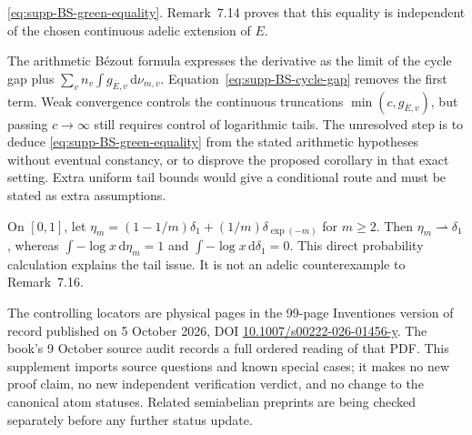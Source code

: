 \documentclass[11pt,a4paper]{article}
\theoremstyle{definition}
\theoremstyle{remark}
\newcommand{\rd}{\mathrm d}
\begin{document}
\begin{description}
\eqref{eq:supp-BS-green-equality}. Remark~7.14 proves that this equality
is independent of the chosen continuous adelic extension of $E$.
\item[The missing passage.]
The arithmetic B\'ezout formula expresses the derivative as the limit
of the cycle gap plus
$\sum_v n_v\int g_{\overline E,v}\,\rd\nu_{m,v}$.
Equation~\eqref{eq:supp-BS-cycle-gap} removes the first term.
Weak convergence controls the continuous truncations
$\min(c,g_{\overline E,v})$, but passing $c\to\infty$ still requires
control of logarithmic tails. The unresolved step is to deduce
\eqref{eq:supp-BS-green-equality} from the stated arithmetic hypotheses
without eventual constancy, or to disprove the proposed corollary in
that exact setting. Extra uniform tail bounds would give a conditional
route and must be stated as extra assumptions.
\item[Elementary obstruction to a weak-convergence-only argument.]
On $[0,1]$, let
$\eta_m=(1-1/m)\delta_1+(1/m)\delta_{\exp(-m)}$ for $m\geq2$.
Then $\eta_m\rightharpoonup\delta_1$, whereas
$\int-\log x\,\rd\eta_m=1$ and
$\int-\log x\,\rd\delta_1=0$.
This direct probability calculation explains the tail issue. It is not
an adelic counterexample to Remark~7.16.
\end{description}

The controlling locators are physical pages in the 99-page Inventiones
version of record published on 5 October 2026, DOI
\href{https://doi.org/10.1007/s00222-026-01456-y}{10.1007/s00222-026-01456-y}.
The book's 9 October source audit records a full ordered reading of that
PDF. This supplement imports source questions and known special cases;
it makes no new proof claim, no new independent verification verdict,
and no change to the canonical atom statuses. Related semiabelian
preprints are being checked separately before any further status update.
\end{document}
